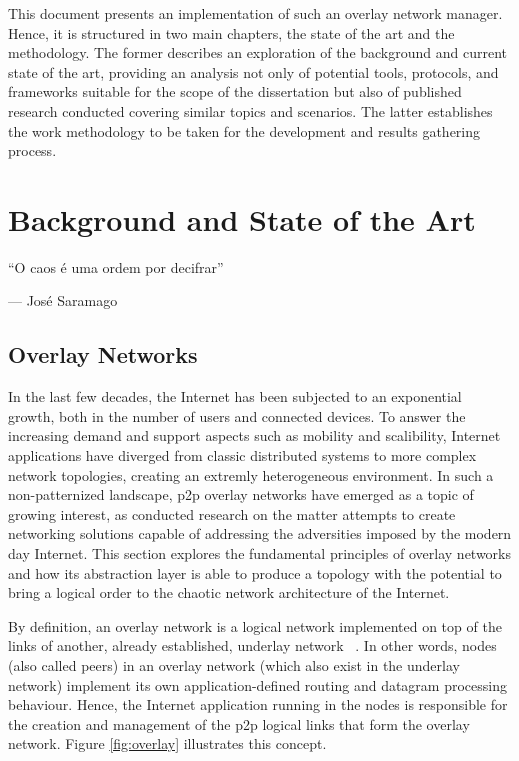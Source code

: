 \documentclass[11pt,twoside,a4paper]{report}
\begin{document}
This document presents an implementation of such an overlay network manager. Hence, it is structured in two main chapters, the state of the art and the methodology. The former describes an exploration of the background and current state of the art, providing an analysis not only of potential tools, protocols, and frameworks suitable for the scope of the dissertation but also of published research conducted covering similar topics and scenarios. The latter establishes the work methodology to be taken for the development and results gathering process.


\cleardoublepage

\chapter{Background and State of the Art}
\label{chapter:sota}

\begin{minipage}{80mm}
     \centering %
     ``O caos é uma ordem por decifrar''
          \begin{flushright}
          --- José Saramago
          \end{flushright}
     \end{minipage}


\section{Overlay Networks}
\label{sec:on}

In the last few decades, the Internet has been subjected to an exponential growth, both in the number of users and connected devices. To answer the increasing demand and support aspects such as mobility and scalibility, Internet applications have diverged from classic distributed systems to more complex network topologies, creating an extremly heterogeneous environment. In such a non-patternized landscape, \ac{p2p} overlay networks have emerged as a topic of growing interest, as conducted research on the matter attempts to create networking solutions capable of addressing the adversities imposed by the modern day Internet. This section explores the fundamental principles of overlay networks and how its abstraction layer is able to produce a topology with the potential to bring a logical order to  the chaotic network architecture of the Internet.

By definition, an overlay network is a logical network implemented on top of the links of another, already established, underlay network ~\cite{netbook}. In other words, nodes (also called peers) in an overlay network (which also exist in the underlay network) implement its own application-defined routing and datagram processing behaviour. Hence, the Internet application running in the nodes is responsible for the creation and management of the \ac{p2p} logical links that form the overlay network. Figure \ref{fig:overlay} illustrates this concept.
\end{document}
